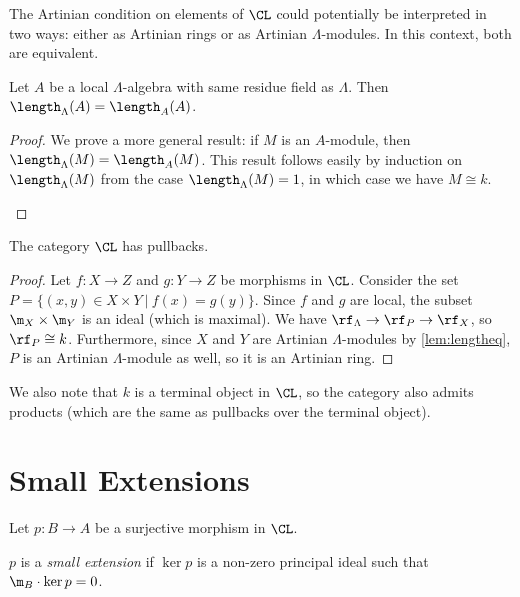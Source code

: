 The Artinian condition on elements of $\CL$ could potentially be
interpreted in two ways: either as Artinian rings or as Artinian
$\Lambda$-modules. In this context, both are equivalent.
\begin{lemma}
  \label{lem:lengtheq}
  \leanok
  Let $A$ be a local $\Lambda$-algebra with same residue field as $\Lambda$.
  Then $\length_\Lambda (A) = \length_A (A)$.
\end{lemma}

\begin{proof}
  \leanok
  We prove a more general result: if $M$ is an $A$-module,
  then $\length_\Lambda (M) = \length_A (M)$.
  This result follows easily by induction on $\length_\Lambda (M)$ from the
  case $\length_\Lambda (M) = 1$, in which case we have $M \cong k$.

  \cite[\href{https://stacks.math.columbia.edu/tag/06GG}{Tag 06GG}]{stacks-project}
\end{proof}

\begin{lemma}
  \label{lem:has_pullbacks}
  \leanok
  The category $\CL$ has pullbacks.
\end{lemma}

\begin{proof}
  \leanok
  Let $f : X \to Z$ and $g : Y \to Z$ be morphisms in $\CL$.
  Consider the set $P = \{(x, y) \in X \times Y ~\vert~ f (x) = g (y)\}$.
  Since $f$ and $g$ are local, the subset $\m_X \times \m_Y$ is an ideal
  (which is maximal).
  We have $\rf_\Lambda \to \rf_P \to \rf_X$, so $\rf_P \cong k$.
  Furthermore, since $X$ and $Y$ are Artinian $\Lambda$-modules
  by \cref{lem:lengtheq}, $P$
  is an Artinian $\Lambda$-module as well, so it is an Artinian ring.
\end{proof}


We also note that $k$ is a terminal object in $\CL$, so the category also
admits products (which are the same as pullbacks over the terminal object).

\section{Small Extensions}

Let $p : B \to A$ be a surjective morphism in $\CL$.

\begin{definition}
  \label{def:IsSmallExtension}
  \leanok
  $p$ is a \emph{small extension} if $\ker p$ is a non-zero principal
  ideal such that $\m_B \cdot \ker p = 0$.
\end{definition}

